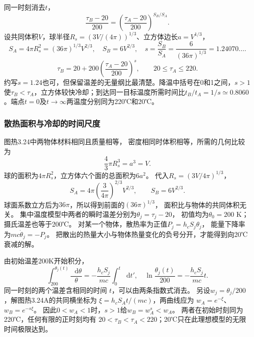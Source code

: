 \documentclass[UTF8,fontset=fandol,a4paper,11pt]{ctexart}
\newcommand{\dd}{\mathop{}\!\mathrm{d}}
\newcommand{\result}[1]{\begin{equation*}\boxed{#1}\end{equation*}}
\begin{document}
同一时刻消去$t$，
\[\frac{\tau_B-20}{200}=\left(\frac{\tau_A-20}{200}\right)^{S_B/S_A}.\]
设共同体积$V$，球半径$R_s=(3V/(4\pi))^{1/3}$、立方体边长$a=V^{1/3}$，
\[S_A=4\pi R_s^2=(36\pi)^{1/3}V^{2/3},\quad
S_B=6V^{2/3},\quad s=\frac{S_B}{S_A}=\frac6{(36\pi)^{1/3}}=1.24070\ldots.\]
\result{\tau_B=20+200\left(\frac{\tau_A-20}{200}\right)^{s},\qquad20\le\tau_A\le220.}
约写$s=1.24$也可，但保留温差的无量纲比最清楚。降温中括号在0和1之间，$s>1$使$\tau_B<\tau_A$，立方体较快冷却；到达同一目标温度所需时间比$t_B/t_A=1/s\simeq0.8060$。端点$t=0$及$t\to\infty$两温度分别同为220℃和20℃。
\subsubsection*{散热面积与冷却的时间尺度}
图热3.24中两物体材料相同且质量相等，
密度相同时体积相等，所需的几何比较为
\[
\frac43\pi R_s^3=a^3=V.
\]
球的面积为$4\pi R_s^2$，立方体六个面的总面积为$6a^2$。
代入$R_s=(3V/4\pi)^{1/3}$，
\[
S_A=4\pi\left(\frac3{4\pi}\right)^{2/3}V^{2/3},
\qquad S_B=6V^{2/3}.
\]
球面系数立方后为$36\pi$，所以得到前面的$(36\pi)^{1/3}$，
面积比与物体的共同体积无关。
集中温度模型中两者的瞬时温差分别为$\theta_j=\tau_j-20$，
初值均为$\theta_0=200$ K；摄氏温差也等于200℃。
对某一个物体，散热率为正值$P_j=h_cS_j\theta_j$，
能量下降率为$mc\dot\theta_j=-P_j$。
把散出的热量大小与物体热量变化的负号分开，才能得到向20℃衰减的解。

由初始温差200K开始积分，
\[
\int_{200}^{\theta_j(t)}\frac{\dd\theta}{\theta}
=-\frac{h_cS_j}{mc}\int_0^t\dd t',
\quad
\ln\frac{\theta_j(t)}{200}=-\frac{h_cS_j}{mc}t.
\]
同一时刻的两个温差含相同的时间 $t$，可以由两条指数式消去。
另设$w_j=\theta_j/200$，解图热3.24A的共同横坐标为
$\xi=h_cS_At/(mc)$，两曲线应为
$w_A=e^{-\xi}$、$w_B=e^{-s\xi}$。
因此$0<w_A<1$时，$s>1$给$w_B=w_A^s<w_A$。
两者在初始时刻同为220℃，任何有限的正时刻均有
$20<\tau_B<\tau_A<220$；20℃只在此理想模型的无限时间极限达到。
\end{document}
